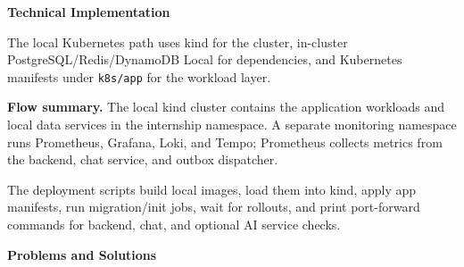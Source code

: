 \vspace{0.5em}\noindent\textbf{Technical Implementation}\par

The local Kubernetes path uses kind for the cluster, in-cluster
PostgreSQL/Redis/DynamoDB Local for dependencies, and Kubernetes
manifests under \texttt{k8s/\allowbreak{}app} for the workload layer.

\textbf{Flow summary.} The local kind cluster contains the application
workloads and local data services in the internship namespace. A
separate monitoring namespace runs Prometheus, Grafana, Loki, and Tempo;
Prometheus collects metrics from the backend, chat service, and outbox
dispatcher.

The deployment scripts build local images, load them into kind, apply
app manifests, run migration/init jobs, wait for rollouts, and print
port-forward commands for backend, chat, and optional AI service checks.

\vspace{0.5em}\noindent\textbf{Problems and Solutions}\par

